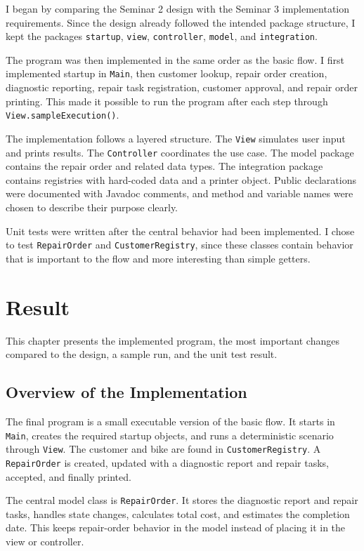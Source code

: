 \documentclass[12pt]{article}
\begin{document}
I began by comparing the Seminar 2 design with the Seminar 3 implementation requirements. Since the design already followed the intended package structure, I kept the packages \texttt{startup}, \texttt{view}, \texttt{controller}, \texttt{model}, and \texttt{integration}.

The program was then implemented in the same order as the basic flow. I first implemented startup in \texttt{Main}, then customer lookup, repair order creation, diagnostic reporting, repair task registration, customer approval, and repair order printing. This made it possible to run the program after each step through \texttt{View.sampleExecution()}.

The implementation follows a layered structure. The \texttt{View} simulates user input and prints results. The \texttt{Controller} coordinates the use case. The model package contains the repair order and related data types. The integration package contains registries with hard-coded data and a printer object. Public declarations were documented with Javadoc comments, and method and variable names were chosen to describe their purpose clearly.

Unit tests were written after the central behavior had been implemented. I chose to test \texttt{RepairOrder} and \texttt{CustomerRegistry}, since these classes contain behavior that is important to the flow and more interesting than simple getters.

\section{Result}

This chapter presents the implemented program, the most important changes compared to the design, a sample run, and the unit test result.

\subsection{Overview of the Implementation}

The final program is a small executable version of the basic flow. It starts in \texttt{Main}, creates the required startup objects, and runs a deterministic scenario through \texttt{View}. The customer and bike are found in \texttt{CustomerRegistry}. A \texttt{RepairOrder} is created, updated with a diagnostic report and repair tasks, accepted, and finally printed.

The central model class is \texttt{RepairOrder}. It stores the diagnostic report and repair tasks, handles state changes, calculates total cost, and estimates the completion date. This keeps repair-order behavior in the model instead of placing it in the view or controller.
\end{document}
